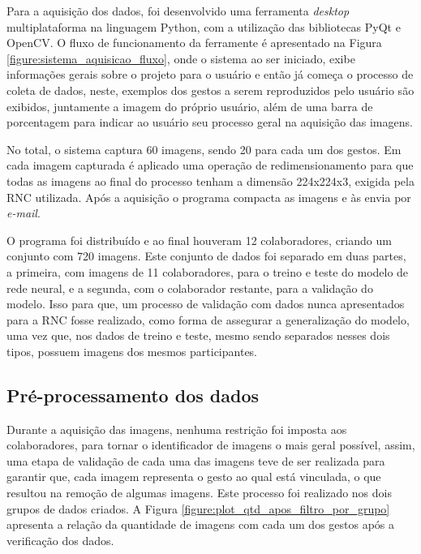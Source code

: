 \par Para a aquisição dos dados, foi desenvolvido uma ferramenta \textit{desktop} multiplataforma na linguagem Python, com a utilização das bibliotecas PyQt e OpenCV. O fluxo de funcionamento da ferramente é apresentado na Figura \ref{figure:sistema_aquisicao_fluxo}, onde o sistema ao ser iniciado, exibe informações gerais sobre o projeto para o usuário e então já começa o processo de coleta de dados, neste, exemplos dos gestos a serem reproduzidos pelo usuário são exibidos, juntamente a imagem do próprio usuário, além de uma barra de porcentagem para indicar ao usuário seu processo geral na aquisição das imagens.


\par No total, o sistema captura 60 imagens, sendo 20 para cada um dos gestos. Em cada imagem capturada é aplicado uma operação de redimensionamento para que todas as imagens ao final do processo tenham a dimensão 224x224x3, exigida pela RNC utilizada. Após a aquisição o programa compacta as imagens e às envia por \textit{e-mail}.

\par O programa foi distribuído e ao final houveram 12 colaboradores, criando um conjunto com 720 imagens. Este conjunto de dados foi separado em duas partes, a primeira, com imagens de 11 colaboradores, para o treino e teste do modelo de rede neural, e a segunda, com o colaborador restante, para a validação do modelo. Isso para que, um processo de validação com dados nunca apresentados para a RNC fosse realizado, como forma de assegurar a generalização do modelo, uma vez que, nos dados de treino e teste, mesmo sendo separados nesses dois tipos, possuem imagens dos mesmos participantes.

\subsection{Pré-processamento dos dados}

\par Durante a aquisição das imagens, nenhuma restrição foi imposta aos colaboradores, para tornar o identificador de imagens o mais geral possível, assim, uma etapa de validação de cada uma das imagens teve de ser realizada para garantir que, cada imagem representa o gesto ao qual está vinculada, o que resultou na remoção de algumas imagens. Este processo foi realizado nos dois grupos de dados criados. A Figura \ref{figure:plot_qtd_apos_filtro_por_grupo} apresenta a relação da quantidade de imagens com cada um dos gestos após a verificação dos dados.

